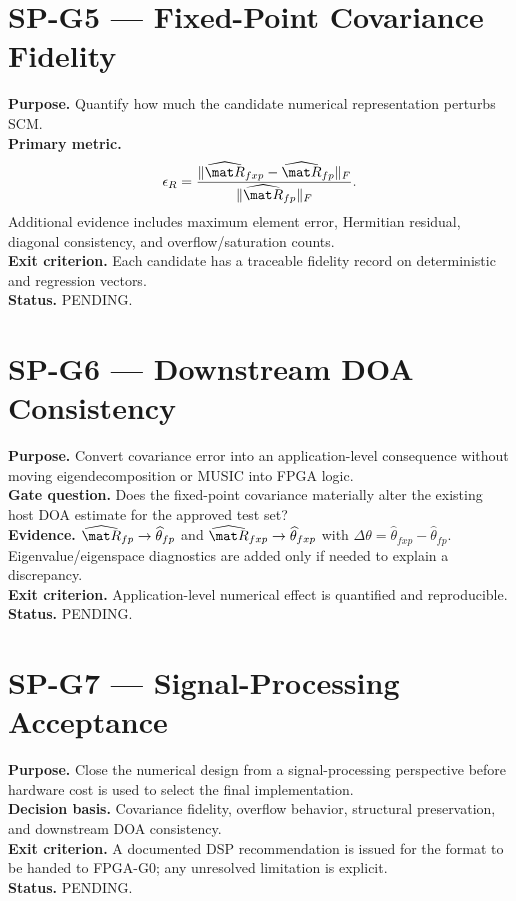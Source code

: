 \section{SP-G5 --- Fixed-Point Covariance Fidelity}
\textbf{Purpose.} Quantify how much the candidate numerical representation perturbs SCM.\\
\textbf{Primary metric.}
\begin{equation}
\epsilon_R=\frac{\|\widehat{\mat R}_{fxp}-\widehat{\mat R}_{fp}\|_F}
{\|\widehat{\mat R}_{fp}\|_F}.
\end{equation}
Additional evidence includes maximum element error, Hermitian residual, diagonal
consistency, and overflow/saturation counts.\\
\textbf{Exit criterion.} Each candidate has a traceable fidelity record on deterministic and
regression vectors.\\
\textbf{Status.} PENDING.

\section{SP-G6 --- Downstream DOA Consistency}
\textbf{Purpose.} Convert covariance error into an application-level consequence without
moving eigendecomposition or MUSIC into FPGA logic.\\
\textbf{Gate question.} Does the fixed-point covariance materially alter the existing host
DOA estimate for the approved test set?\\
\textbf{Evidence.}
$\widehat{\mat R}_{fp}\rightarrow\widehat\theta_{fp}$ and
$\widehat{\mat R}_{fxp}\rightarrow\widehat\theta_{fxp}$ with
$\Delta\theta=\widehat\theta_{fxp}-\widehat\theta_{fp}$. Eigenvalue/eigenspace diagnostics
are added only if needed to explain a discrepancy.\\
\textbf{Exit criterion.} Application-level numerical effect is quantified and reproducible.\\
\textbf{Status.} PENDING.

\section{SP-G7 --- Signal-Processing Acceptance}
\textbf{Purpose.} Close the numerical design from a signal-processing perspective before
hardware cost is used to select the final implementation.\\
\textbf{Decision basis.} Covariance fidelity, overflow behavior, structural preservation,
and downstream DOA consistency.\\
\textbf{Exit criterion.} A documented DSP recommendation is issued for the format to be
handed to FPGA-G0; any unresolved limitation is explicit.\\
\textbf{Status.} PENDING.
